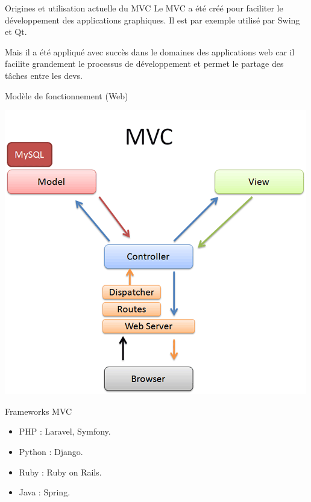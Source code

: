 \documentclass{beamer}
\begin{document}
\begin{frame}{Origines et utilisation actuelle du MVC}
  Le MVC a été créé pour faciliter le développement des applications graphiques. Il est par exemple utilisé par Swing et Qt.
  
  Mais il a été appliqué avec succès dans le domaines des applications web car il facilite grandement le processus de développement et permet le partage des tâches entre les devs.
\end{frame}

\begin{frame}{Modèle de fonctionnement (Web)}
  \begin{center}
    \includegraphics[scale=0.4]{images/mvc-rails.converted.png}
  \end{center}
\end{frame}

\begin{frame}{Frameworks MVC}
  \begin{itemize}
    \item PHP : Laravel, Symfony.
    \item Python : Django.
    \item Ruby : Ruby on Rails.
    \item Java : Spring.
  \end{itemize}
\end{frame}
\end{document}
